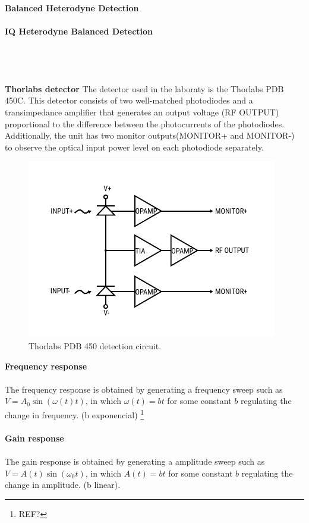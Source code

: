 \paragraph{Balanced Heterodyne Detection}

\paragraph{IQ Heterodyne Balanced Detection}
\ \\
\\
\\
%
%
{\bf Thorlabs detector}
The detector used in the laboraty is the Thorlabs PDB 450C. This detector consists of two well-matched photodiodes and a transimpedance amplifier that generates an output voltage (RF OUTPUT) proportional to the difference between the photocurrents of the photodiodes.\\
Additionally, the unit has two monitor outputs(MONITOR+ and MONITOR-) to observe the optical input power level on each photodiode separately.
\begin{figure}[H]
	\centering
	\includegraphics{./sdf/quantum_noise/figures/thorlabs-circuit.pdf}
	\caption{Thorlabs PDB 450 detection circuit.}
\end{figure}
\noindent
{\bf Frequency response}\\
\\
The frequency response is obtained by generating a frequency sweep such as $V = A_0 \sin \left( \omega(t) t \right)$, in which $\omega(t) = b t$ for some constant $b$ regulating the change in frequency. (b exponencial)
\footnote{REF?}
\\
\\
{\bf Gain response}\\
\\
The gain response is obtained by generating a amplitude sweep such as $V = A(t) \sin \left( \omega_0 t \right)$, in which $A(t) = b t$ for some constant $b$ regulating the change in amplitude. (b linear).
